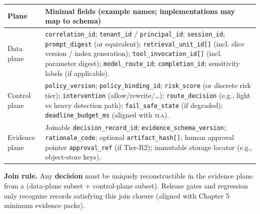 \documentclass[11pt,a4paper]{report}
\begin{document}
\begin{center}
\footnotesize
\begin{tabular}{@{}p{}p{}@{}}
\toprule
\textbf{Plane} & \textbf{Minimal fields (example names; implementations may map to schema)} \\
\midrule
Data plane & \texttt{correlation\_id}; \texttt{tenant\_id} / \texttt{principal\_id}; \texttt{session\_id}; \texttt{prompt\_digest} (or equivalent); \texttt{retrieval\_unit\_id[]} (incl. slice version / index generation); \texttt{tool\_invocation\_id[]} (incl. parameter digest); \texttt{model\_route\_id}; \texttt{completion\_id}; sensitivity labels (if applicable). \\
Control plane & \texttt{policy\_version}; \texttt{policy\_binding\_id}; \texttt{risk\_score} (or discrete risk tier); \texttt{intervention} (allow/rewrite/\ldots); \texttt{route\_decision} (e.g., light vs heavy detection path); \texttt{fail\_safe\_state} (if degraded); \texttt{deadline\_budget\_ms} (aligned with \textsc{sla}). \\
Evidence plane & Joinable \texttt{decision\_record\_id}; \texttt{evidence\_schema\_version}; \texttt{rationale\_code}; optional \texttt{artifact\_hash[]}; human approval pointer \texttt{approval\_ref} (if Tier-R2); immutable storage locator (e.g., object-store keys). \\
\bottomrule
\end{tabular}
\end{center}

\noindent\textbf{Join rule.} Any \textbf{decision} must be uniquely reconstructible in the evidence plane from a (data-plane subset + control-plane subset). Release gates and regression only recognize records satisfying this join closure (aligned with Chapter 5 minimum evidence packs).
\end{document}
